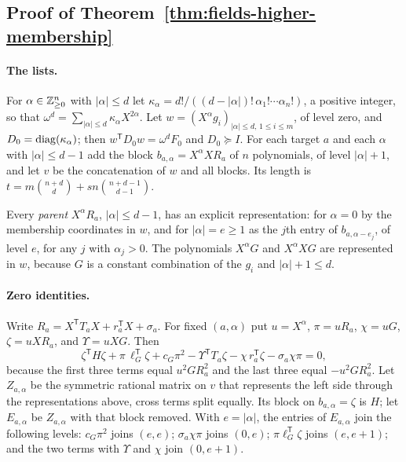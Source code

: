 \subsection{Proof of Theorem~\ref{thm:fields-higher-membership}}
\label{app:fields-higher}

\paragraph{The lists.}
For $\alpha\in\mathbb Z_{\ge0}^n$ with $|\alpha|\le d$ let
$\kappa_\alpha=d!/((d-|\alpha|)!\,\alpha_1!\cdots\alpha_n!)$, a positive
integer, so that $\omega^d=\sum_{|\alpha|\le d}\kappa_\alpha X^{2\alpha}$.
Let $w=(X^\alpha g_i)_{|\alpha|\le d,\,1\le i\le m}$, of level zero, and
$D_0=\operatorname{diag}(\kappa_\alpha)$; then $w^{\mathsf T}D_0w=\omega^dF_0$ and
$D_0\succeq I$. For each target $a$ and each $\alpha$ with
$|\alpha|\le d-1$ add the block $b_{a,\alpha}=X^\alpha XR_a$ of $n$
polynomials, of level $|\alpha|+1$, and let $v$ be the concatenation of $w$
and all blocks. Its length is
$t=m\binom{n+d}d+sn\binom{n+d-1}{d-1}$.

Every \emph{parent} $X^\alpha R_a$, $|\alpha|\le d-1$, has an explicit
representation: for $\alpha=0$ by the membership coordinates in $w$, and for
$|\alpha|=e\ge1$ as the $j$th entry of $b_{a,\alpha-e_j}$, of level $e$, for
any $j$ with $\alpha_j>0$. The polynomials $X^\alpha G$ and $X^\alpha XG$ are
represented in $w$, because $G$ is a constant combination of the $g_i$ and
$|\alpha|+1\le d$.

\paragraph{Zero identities.}
Write $R_a=X^{\mathsf T}T_aX+r_a^{\mathsf T}X+\sigma_a$. For fixed
$(a,\alpha)$ put $u=X^\alpha$, $\pi=uR_a$, $\chi=uG$, $\zeta=uXR_a$, and
$\Upsilon=uXG$. Then
\begin{equation}
 \zeta^{\mathsf T}H\zeta+\pi\,\ell_G^{\mathsf T}\zeta+c_G\pi^2
 -\Upsilon^{\mathsf T}T_a\zeta-\chi\,r_a^{\mathsf T}\zeta-\sigma_a\chi\pi=0,
 \label{eq:fields-level-identity}
\end{equation}
because the first three terms equal $u^2GR_a^2$ and the last three equal
$-u^2GR_a^2$. Let $Z_{a,\alpha}$ be the symmetric rational matrix on $v$ that
represents the left side through the representations above, cross terms split
equally. Its block on $b_{a,\alpha}=\zeta$ is $H$; let $E_{a,\alpha}$ be
$Z_{a,\alpha}$ with that block removed. With $e=|\alpha|$, the entries of
$E_{a,\alpha}$ join the following levels: $c_G\pi^2$ joins $(e,e)$;
$\sigma_a\chi\pi$ joins $(0,e)$; $\pi\ell_G^{\mathsf T}\zeta$ joins
$(e,e+1)$; and the two terms with $\Upsilon$ and $\chi$ join $(0,e+1)$.

